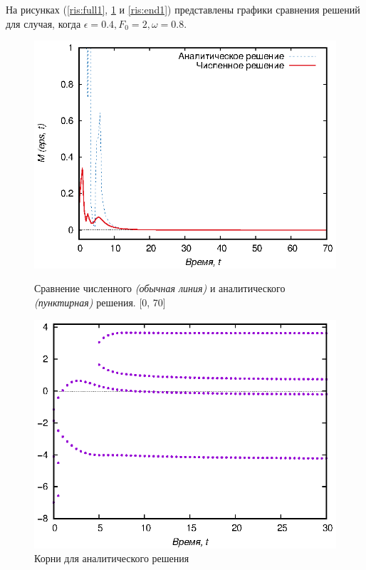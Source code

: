 \documentclass[14pt]{article}
\numberwithin{figure}{section}
\numberwithin{equation}{section}
\begin{document}
На рисунках (\ref{ris:full1}, \ref{ris:rootsend1} и \ref{ris:end1}) представлены графики сравнения решений для случая, когда $\epsilon = 0.4, F_0 = 2, \omega = 0.8$.

\begin{figure}[h]
	\begin{center}
		\begin{minipage}[h]{0.45\linewidth}
			\includegraphics[width=1\linewidth]{full1}
			\caption{Сравнение численного \textit{(обычная линия)} и аналитического \textit{(пунктирная)} решения. [0, 70]} %
			\label{ris:full1} %
		\end{minipage}
		\hfill 
		\begin{minipage}[h]{0.45\linewidth}
			\includegraphics[width=1\linewidth]{rootsend1}
			\caption{Корни для аналитического решения }
			\label{ris:rootsend1}
		\end{minipage}
	\end{center}
\end{figure}
\end{document}
